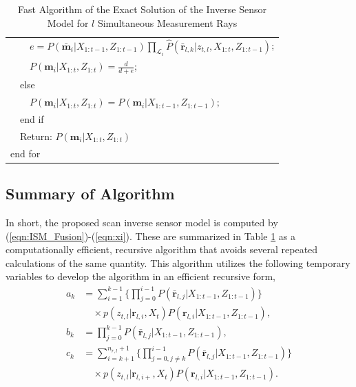 \documentclass[letterpaper, 10pt, conference]{ieeeconf}
\newcommand{\refeqn}[1]{(\ref{eqn:#1})}
\begin{document}
\begin{table}
\begin{tabular}{ l }
   \ \ \ \ $e=P(\bar{\mathbf{m}}_i|X_{1:t-1},Z_{1:t-1})\prod_{\mathcal L_i}\hat P(\bar{\mathbf{r}}_{l,k}|z_{t,l},X_{1:t},Z_{1:t-1})$;\\
   \ \ \ \ $P(\mathbf{m}_i|X_{1:t},Z_{1:t})=\frac{d}{d+e}$;\\
   \ \ else\\
   \ \ \ \ $P(\mathbf{m}_i|X_{1:t},Z_{1:t})=P(\mathbf{m}_i|X_{1:t-1},Z_{1:t-1});$\\
   \ \ end if\\
   \ \ Return: $P(\mathbf{m}_i|X_{1:t},Z_{1:t})$\\
   end for\\

\end{tabular}
\caption{Fast Algorithm of the Exact Solution of the Inverse Sensor Model for $l$ Simultaneous Measurement Rays}
\label{tab:Alg_ISM_2D}
\end{table}

\subsection{Summary of Algorithm}

In short, the proposed scan inverse sensor model is computed by \refeqn{ISM_Fusion}-\refeqn{xi}. These are summarized in Table \ref{tab:Alg_ISM_2D} as a computationally efficient, recursive algorithm that avoids several repeated calculations of the same quantity. This algorithm utilizes the following temporary variables to develop the algorithm in an efficient recursive form, %
\begin{align*}
a_k&=\sum_{i=1}^{k-1}\bigg\{\prod_{j=0}^{i-1}P(\bar{\mathbf{r}}_{l,j}|X_{1:t-1},Z_{1:t-1})\bigg\}\nonumber\\&\quad\times p(z_{t,l}|\mathbf{r}_{l,i},X_t)P(\mathbf{r}_{l,i}|X_{1:t-1},Z_{1:t-1}),
\\
b_k&=\prod_{j=0}^{k-1}P(\bar{\mathbf{r}}_{l,j}|X_{1:t-1},Z_{1:t-1}),
\nonumber\\
c_k&=
\sum_{i=k+1}^{n_{r,l}+1}\bigg\{\prod_{j=0,j\neq k}^{i-1}P(\bar{\mathbf{r}}_{l,j}|X_{1:t-1},Z_{1:t-1})\bigg\}\nonumber\\&\quad\times p(z_{t,l}|\mathbf{r}_{l,i+},X_t)P(\mathbf{r}_{l,i}|X_{1:t-1},Z_{1:t-1}).%
\end{align*}
\end{document}
